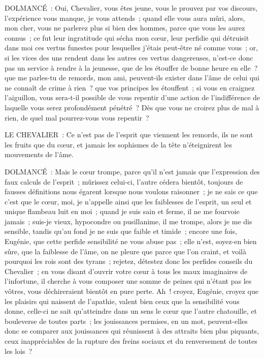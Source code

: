 \documentclass[french,twoside]{book} %
\begin{document}
DOLMANCÉ : Oui, Chevalier, vous êtes jeune, vous le prouvez par vos discours, l’expérience vous manque, je vous attends ; quand elle vous aura mûri, alors, mon cher, vous ne parlerez plus si bien des hommes, parce que vous les aurez connus ; ce fut leur ingratitude qui sécha mon cœur, leur perfidie qui détruisit dans moi ces vertus funestes pour lesquelles j’étais peut-être né comme vous ; or, si les vices des uns rendent dans les autres ces vertus dangereuses, n’est-ce donc pas un service à rendre à la jeunesse, que de les étouffer de bonne heure en elle ? que me parles-tu de remords, mon ami, peuvent-ils exister dans l’âme de celui qui ne connaît de crime à rien ? que vos principes les étouffent ; si vous en craignez l’aiguillon, vous sera-t-il possible de vous repentir d’une action de l’indifférence de laquelle vous serez profondément pénétré ? Dès que vous ne croirez plus de mal à rien, de quel mal pourrez-vous vous repentir ?\par
LE CHEVALIER : Ce n’est pas de l’esprit que viennent les remords, ils ne sont les fruits que du cœur, et jamais les sophismes de la tête n’éteignirent les mouvements de l’âme.\par
DOLMANCÉ : Mais le cœur trompe, parce qu’il n’est jamais que l’expression des faux calculs de l’esprit ; mûrissez celui-ci, l’autre cédera bientôt, toujours de fausses définitions nous égarent lorsque nous voulons raisonner ; je ne sais ce que c’est que le cœur, moi, je n’appelle ainsi que les faiblesses de l’esprit, un seul et unique flambeau luit en moi ; quand je suis sain et ferme, il ne me fourvoie jamais ; suis-je vieux, hypocondre ou pusillanime, il me trompe, alors je me dis sensible, tandis qu’au fond je ne suis que faible et timide ; encore une fois, Eugénie, que cette perfide sensibilité ne vous abuse pas ; elle n’est, soyez-en bien sûre, que la faiblesse de l’âme, on ne pleure que parce que l’on craint, et voilà pourquoi les rois sont des tyrans ; rejetez, détestez donc les perfides conseils du Chevalier ; en vous disant d’ouvrir votre cœur à tous les maux imaginaires de l’infortune, il cherche à vous composer une somme de peines qui n’étant pas les vôtres, vous déchireraient bientôt en pure perte. Ah ! croyez, Eugénie, croyez que les plaisirs qui naissent de l’apathie, valent bien ceux que la sensibilité vous donne, celle-ci ne sait qu’atteindre dans un sens le cœur que l’autre chatouille, et bouleverse de toutes parts ; les jouissances permises, en un mot, peuvent-elles donc se comparer aux jouissances qui réunissent à des attraits bien plus piquants, ceux inappréciables de la rupture des freins sociaux et du renversement de toutes les lois ?\par
\end{document}
